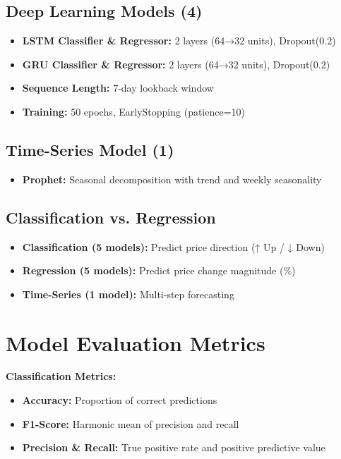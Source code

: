 \subsection{Deep Learning Models (4)}
\begin{itemize}
    \item \textbf{LSTM Classifier \& Regressor:} 2 layers (64→32 units), Dropout(0.2)
    \item \textbf{GRU Classifier \& Regressor:} 2 layers (64→32 units), Dropout(0.2)
    \item \textbf{Sequence Length:} 7-day lookback window
    \item \textbf{Training:} 50 epochs, EarlyStopping (patience=10)
\end{itemize}

\subsection{Time-Series Model (1)}
\begin{itemize}
    \item \textbf{Prophet:} Seasonal decomposition with trend and weekly seasonality
\end{itemize}

\subsection{Classification vs. Regression}
\begin{itemize}
    \item \textbf{Classification (5 models):} Predict price direction (↑ Up / ↓ Down)
    \item \textbf{Regression (5 models):} Predict price change magnitude (\%)
    \item \textbf{Time-Series (1 model):} Multi-step forecasting
\end{itemize}

\section{Model Evaluation Metrics}

\textbf{Classification Metrics:}
\begin{itemize}
    \item \textbf{Accuracy:} Proportion of correct predictions
    \item \textbf{F1-Score:} Harmonic mean of precision and recall
    \item \textbf{Precision \& Recall:} True positive rate and positive predictive value
\end{itemize}

